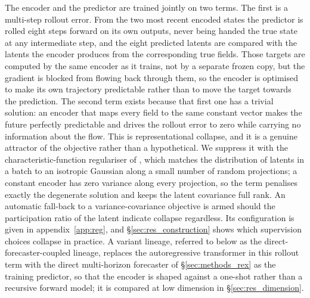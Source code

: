 The encoder and the predictor are trained jointly on two terms. The first is a multi-step rollout error. From the two most recent encoded states the predictor is rolled eight steps forward on its own outputs, never being handed the true state at any intermediate step, and the eight predicted latents are compared with the latents the encoder produces from the corresponding true fields. Those targets are computed by the same encoder as it trains, not by a separate frozen copy, but the gradient is blocked from flowing back through them, so the encoder is optimised to make its own trajectory predictable rather than to move the target towards the prediction. The second term exists because that first one has a trivial solution: an encoder that maps every field to the same constant vector makes the future perfectly predictable and drives the rollout error to zero while carrying no information about the flow. This is representational collapse, and it is a genuine attractor of the objective rather than a hypothetical. We suppress it with the characteristic-function regulariser of \citet{lejepa,lewm}, which matches the distribution of latents in a batch to an isotropic Gaussian along a small number of random projections; a constant encoder has zero variance along every projection, so the term penalises exactly the degenerate solution and keeps the latent covariance full rank. An automatic fall-back to a variance-covariance objective \citep{vicreg} is armed should the participation ratio of the latent indicate collapse regardless. Its configuration is given in appendix~\ref{app:reg}, and \S\ref{sec:res_construction} shows which supervision choices collapse in practice. A variant lineage, referred to below as the direct-forecaster-coupled lineage, replaces the autoregressive transformer in this rollout term with the direct multi-horizon forecaster of \S\ref{sec:methods_rex} as the training predictor, so that the encoder is shaped against a one-shot rather than a recursive forward model; it is compared at low dimension in \S\ref{sec:res_dimension}.\re

